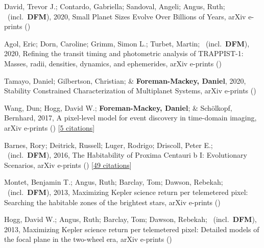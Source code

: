 \item[{\color{numcolor}\scriptsize7}] David, Trevor J.; Contardo, Gabriella; Sandoval, Angeli; Angus, Ruth; \etal\ (incl.\ \textbf{DFM}), 2020, Small Planet Sizes Evolve Over Billions of Years, arXiv e-prints ()

\item[{\color{numcolor}\scriptsize6}] Agol, Eric; Dorn, Caroline; Grimm, Simon L.; Turbet, Martin; \etal\ (incl.\ \textbf{DFM}), 2020, Refining the transit timing and photometric analysis of TRAPPIST-1: Masses, radii, densities, dynamics, and ephemerides, arXiv e-prints ()

\item[{\color{numcolor}\scriptsize5}] Tamayo, Daniel; Gilbertson, Christian; \& \textbf{Foreman-Mackey, Daniel}, 2020, Stability Constrained Characterization of Multiplanet Systems, arXiv e-prints ()

\item[{\color{numcolor}\scriptsize4}] Wang, Dun; Hogg, David W.; \textbf{Foreman-Mackey, Daniel}; \& Sch{\"o}lkopf, Bernhard, 2017, A pixel-level model for event discovery in time-domain imaging, arXiv e-prints () [\href{https://ui.adsabs.harvard.edu/abs/2017arXiv171002428W}{5 citations}]

\item[{\color{numcolor}\scriptsize3}] Barnes, Rory; Deitrick, Russell; Luger, Rodrigo; Driscoll, Peter E.; \etal\ (incl.\ \textbf{DFM}), 2016, The Habitability of Proxima Centauri b I: Evolutionary Scenarios, arXiv e-prints () [\href{https://ui.adsabs.harvard.edu/abs/2016arXiv160806919B}{49 citations}]

\item[{\color{numcolor}\scriptsize2}] Montet, Benjamin T.; Angus, Ruth; Barclay, Tom; Dawson, Rebekah; \etal\ (incl.\ \textbf{DFM}), 2013, Maximizing Kepler science return per telemetered pixel: Searching the habitable zones of the brightest stars, arXiv e-prints ()

\item[{\color{numcolor}\scriptsize1}] Hogg, David W.; Angus, Ruth; Barclay, Tom; Dawson, Rebekah; \etal\ (incl.\ \textbf{DFM}), 2013, Maximizing Kepler science return per telemetered pixel: Detailed models of the focal plane in the two-wheel era, arXiv e-prints ()